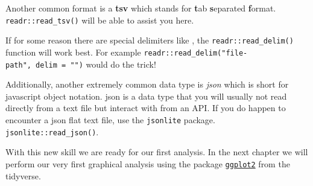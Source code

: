 \documentclass[
]{book}
\newenvironment{Shaded}{\begin{snugshade}}{\end{snugshade}}
\newcommand{\CommentTok}[1]{\textcolor[rgb]{0.56,0.35,0.01}{\textit{#1}}}
\newcommand{\KeywordTok}[1]{\textcolor[rgb]{0.13,0.29,0.53}{\textbf{#1}}}
\newcommand{\NormalTok}[1]{#1}
\newcommand{\OperatorTok}[1]{\textcolor[rgb]{0.81,0.36,0.00}{\textbf{#1}}}
\newcommand{\StringTok}[1]{\textcolor[rgb]{0.31,0.60,0.02}{#1}}
\begin{document}
\begin{Shaded}
\end{Shaded}

Another common format is a \textbf{tsv} which stands for \textbf{t}ab \textbf{s}eparated \textbf{f}ormat. \texttt{readr::read\_tsv()} will be able to assist you here.

If for some reason there are special delimiters like \texttt{\textbar{}}, the \texttt{readr::read\_delim()} function will work best. For example \texttt{readr::read\_delim("file-path",\ delim\ =\ "\textbar{}")} would do the trick!

Additionally, another extremely common data type is \emph{json} which is short for javascript object notation. json is a data type that you will usually not read directly from a text file but interact with from an API. If you do happen to encounter a json flat text file, use the \texttt{jsonlite} package. \texttt{jsonlite::read\_json()}.

With this new skill we are ready for our first analysis. In the next chapter we will perform our very first graphical analysis using the package \href{https://ggplot2.tidyverse.org}{\texttt{ggplot2}} from the tidyverse.
\end{document}
